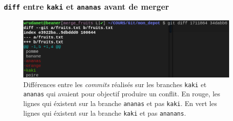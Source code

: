 \documentclass[table,tikz,12pt,svgnames]{beamer}
\begin{document}
\begin{frame}
\frametitle{\texttt{diff} entre \texttt{kaki} et \texttt{ananas} avant de merger}
\begin{adjustwidth}{-0.8cm}{-0.8cm}{}
	\begin{figure}
		\centering
		\includegraphics[scale=0.35]{images/git_diff_conflict.png}
		{Différences entre les \textit{commits} réalisés sur les branches \texttt{kaki} et \texttt{ananas} qui avaient pour objectif produire un conflit. En {\color{red}rouge}, les lignes qui éxistent sur la branche \texttt{ananas} et pas \texttt{kaki}. En {\color{green}vert} les lignes qui éxistent sur la branche \texttt{kaki} et pas \texttt{ananans}.}
		\label{figure:example}
	\end{figure}
\end{adjustwidth}
\end{frame}

\end{document}
